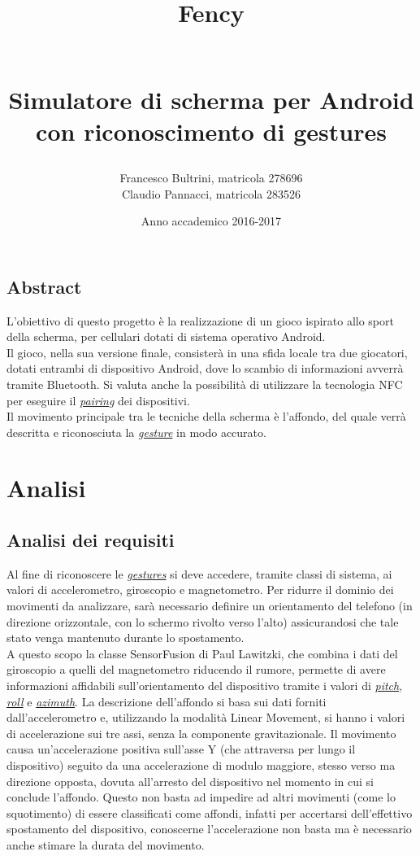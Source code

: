 \documentclass[a4paper,11pt]{article}
\title{
\begin{Huge}
Fency\\\ \\
\end{Huge}
Simulatore di scherma per Android\\con riconoscimento di gestures}
\author{Francesco Bultrini, matricola 278696\\
 Claudio Pannacci, matricola 283526}
\date{Anno accademico 2016-2017}
\begin{document}
\maketitle

\newpage

\tableofcontents

\newpage

\subsection{Abstract}
L'obiettivo di questo progetto è la realizzazione di un gioco  ispirato allo sport della scherma, per cellulari dotati di sistema operativo Android.\\ Il gioco, nella sua versione finale, consisterà in una sfida locale tra due giocatori, dotati entrambi di dispositivo Android, dove lo scambio di informazioni avverrà tramite Bluetooth. Si valuta anche la possibilità di utilizzare la tecnologia NFC per eseguire il \hyperref[pairing]{\emph{pairing}} dei dispositivi.\\ Il movimento principale tra le tecniche della scherma è l'affondo, del quale verrà descritta e riconosciuta la \hyperref[gesture]{\emph{gesture}} in modo accurato.

\newpage
\section{Analisi}
\subsection{Analisi dei requisiti}
Al fine di riconoscere le \hyperref[gesture]{\emph{gestures}} si deve accedere, tramite classi di sistema, ai valori di accelerometro, giroscopio e magnetometro. Per ridurre il dominio dei movimenti da analizzare, sarà necessario definire un orientamento del telefono (in direzione orizzontale, con lo schermo rivolto verso l'alto) assicurandosi che tale stato venga mantenuto durante lo spostamento.\\ A questo scopo la classe SensorFusion di Paul Lawitzki, che combina i dati del giroscopio a quelli del magnetometro riducendo il rumore, permette di avere informazioni affidabili sull'orientamento del dispositivo tramite i valori di \hyperref[pitch]{\emph{pitch}}, \hyperref[roll]{\emph{roll}} e \hyperref[azimuth]{\emph{azimuth}}. La descrizione dell'affondo si basa sui dati forniti dall'accelerometro e, utilizzando la modalità Linear Movement, si hanno i valori di accelerazione sui tre assi, senza la componente gravitazionale. Il movimento causa un'accelerazione positiva sull'asse Y (che attraversa per lungo il dispositivo) seguito da una accelerazione di modulo maggiore, stesso verso ma direzione opposta, dovuta all'arresto del dispositivo nel momento in cui si conclude l'affondo. Questo non basta ad impedire ad altri movimenti (come lo squotimento) di essere classificati come affondi, infatti per accertarsi dell'effettivo spostamento del dispositivo, conoscerne l'accelerazione non basta ma è necessario anche stimare la durata del movimento.
\end{document}
